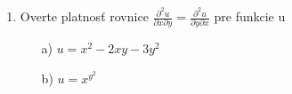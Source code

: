 \begin{enumerate}
\item Overte platnosť rovnice
$\frac{\partial^2 u}{\partial x \partial y}=\frac{\partial^2 u}{\partial y \partial x}$ pre funkcie u

\begin{enumerate}
\item[a)]{$u=x^2-2xy-3y^2$}
\item[b)]{$u=x^{y^2}$}
\end{enumerate}




\end{enumerate}